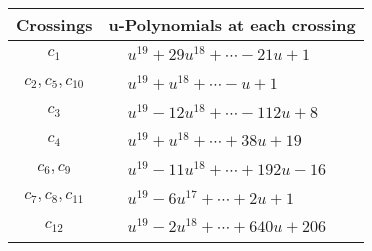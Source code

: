 \documentclass[1p]{elsarticle_modified}
\theoremstyle{definition}
\begin{document}
\begin{tabular}{m{50pt}|m{274pt}}
Crossings & \hspace{64pt}u-Polynomials at each crossing \\
\hline $$\begin{aligned}c_{1}\end{aligned}$$&$\begin{aligned}
&u^{19}+29 u^{18}+\cdots-21 u+1
\end{aligned}$\\
\hline $$\begin{aligned}c_{2},c_{5},c_{10}\end{aligned}$$&$\begin{aligned}
&u^{19}+u^{18}+\cdots- u+1
\end{aligned}$\\
\hline $$\begin{aligned}c_{3}\end{aligned}$$&$\begin{aligned}
&u^{19}-12 u^{18}+\cdots-112 u+8
\end{aligned}$\\
\hline $$\begin{aligned}c_{4}\end{aligned}$$&$\begin{aligned}
&u^{19}+u^{18}+\cdots+38 u+19
\end{aligned}$\\
\hline $$\begin{aligned}c_{6},c_{9}\end{aligned}$$&$\begin{aligned}
&u^{19}-11 u^{18}+\cdots+192 u-16
\end{aligned}$\\
\hline $$\begin{aligned}c_{7},c_{8},c_{11}\end{aligned}$$&$\begin{aligned}
&u^{19}-6 u^{17}+\cdots+2 u+1
\end{aligned}$\\
\hline $$\begin{aligned}c_{12}\end{aligned}$$&$\begin{aligned}
&u^{19}-2 u^{18}+\cdots+640 u+206
\end{aligned}$\\
\hline
\end{tabular}\\~\\
\newpage\renewcommand{\arraystretch}{1}
\end{document}
